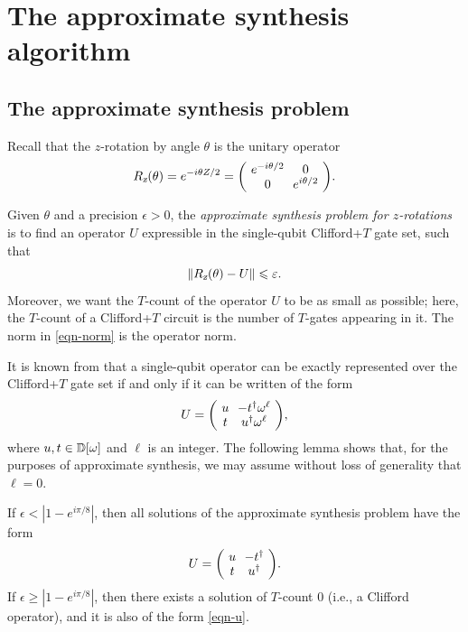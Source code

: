 \documentclass{article}
\begin{document}
\section{The approximate synthesis algorithm}
\label{sec-algorithm}

\subsection{The approximate synthesis problem}
\label{ssec-app-synth-problem}

Recall that the $z$-rotation by angle $\theta$ is the unitary operator
\[ \Rz(\theta) = e^{-i\theta Z/2} = \zmatrix{cc}{e^{-i\theta/2} & 0 \\
  0 & e^{i\theta/2}}.
\]
\begin{definition}\label{def-synthesis-problem}
  Given $\theta$ and a precision $\epsilon>0$, the {\em approximate
    synthesis problem for $z$-rotations} is to find an operator $U$
  expressible in the single-qubit Clifford+$T$ gate set, such that
  \begin{equation}\label{eqn-norm}
    \|R_{\textsl{z}}(\theta) - U\| \leqslant \varepsilon.
  \end{equation}
  Moreover, we want the $T$-count of the operator $U$ to be as small
  as possible; here, the $T$-count of a Clifford+$T$ circuit is the
  number of $T$-gates appearing in it. The norm in {\eqref{eqn-norm}}
  is the operator norm.
\end{definition}

It is known from {\cite{Kliuchnikov-etal}} that a single-qubit
operator can be exactly represented over the Clifford+$T$ gate set if
and only if it can be written of the form
\begin{equation}\label{eqn-u-ell}
 U = \zmatrix{cc}{u & -t\da\omega^\ell \\ t & u\da\omega^\ell},
\end{equation}
where $u,t\in{\mathbb{D}}[\omega]$ and $\ell$ is an integer. The following lemma
shows that, for the purposes of approximate synthesis, we may assume
without loss of generality that $\ell=0$.

\begin{lemma}\label{lem-ell}
  If $\epsilon<|1-e^{i\pi/8}|$, then all solutions of the approximate
  synthesis problem have the form
  \begin{equation}\label{eqn-u}
    U = \zmatrix{cc}{u & -t\da \\ t & u\da}.
  \end{equation}
  If $\epsilon\geq|1-e^{i\pi/8}|$, then there exists a solution of
  $T$-count 0 (i.e., a Clifford operator), and it is also of the form
  {\eqref{eqn-u}}.
\end{lemma}
\end{document}
